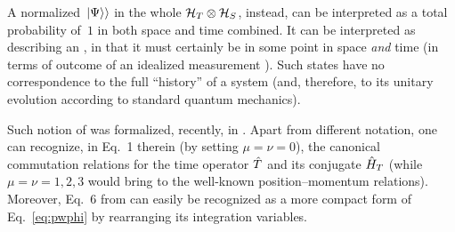 A normalized $\left.\left| \Psi \right\rangle\right\rangle$ in the whole $\mathcal{H}_T \otimes \mathcal{H}_S$,
instead,
can be interpreted as a total probability of~$1$ in both space and time combined.
It can be interpreted as describing an ,
in that it
must certainly be in some point in space
\emph{and} time (in terms of outcome of an idealized measurement%
).
Such states have no correspondence to the full ``history'' of a system
(and, therefore, to its unitary evolution according to standard quantum mechanics).

Such notion of  was formalized, recently, in \cite{MacconeGeomEvents}.
Apart from different notation, one can recognize, in Eq.~1 therein
(by setting $\mu = \nu = 0$), 
the canonical commutation relations for the time operator $\hat{T}$ and its conjugate $\hat{H}_T$
(while $\mu = \nu = 1, 2, 3$ would bring to the well-known position--momentum relations).
Moreover, Eq.~6 from \cite{MacconeGeomEvents} can easily be recognized as a more compact form of Eq.~\eqref{eq:pwphi}
by rearranging its integration variables.




